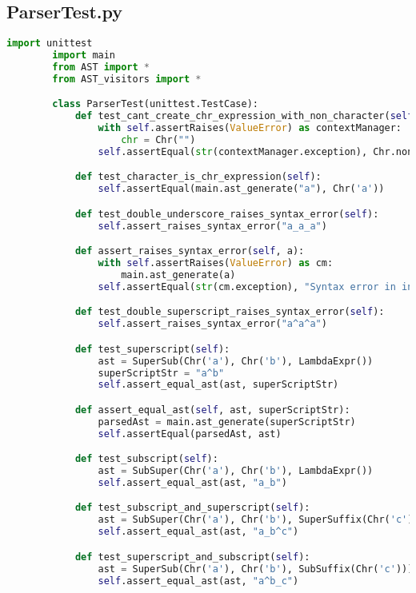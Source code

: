 \subsection{ParserTest.py}

    \begin{lstlisting}[language=Python]
        import unittest
        import main
        from AST import *
        from AST_visitors import *

        class ParserTest(unittest.TestCase):
            def test_cant_create_chr_expression_with_non_character(self):
                with self.assertRaises(ValueError) as contextManager:
                    chr = Chr("")
                self.assertEqual(str(contextManager.exception), Chr.non_character_error_description)

            def test_character_is_chr_expression(self):
                self.assertEqual(main.ast_generate("a"), Chr('a'))

            def test_double_underscore_raises_syntax_error(self):
                self.assert_raises_syntax_error("a_a_a")

            def assert_raises_syntax_error(self, a):
                with self.assertRaises(ValueError) as cm:
                    main.ast_generate(a)
                self.assertEqual(str(cm.exception), "Syntax error in input!")

            def test_double_superscript_raises_syntax_error(self):
                self.assert_raises_syntax_error("a^a^a")

            def test_superscript(self):
                ast = SuperSub(Chr('a'), Chr('b'), LambdaExpr())
                superScriptStr = "a^b"
                self.assert_equal_ast(ast, superScriptStr)

            def assert_equal_ast(self, ast, superScriptStr):
                parsedAst = main.ast_generate(superScriptStr)
                self.assertEqual(parsedAst, ast)

            def test_subscript(self):
                ast = SubSuper(Chr('a'), Chr('b'), LambdaExpr())
                self.assert_equal_ast(ast, "a_b")

            def test_subscript_and_superscript(self):
                ast = SubSuper(Chr('a'), Chr('b'), SuperSuffix(Chr('c')))
                self.assert_equal_ast(ast, "a_b^c")

            def test_superscript_and_subscript(self):
                ast = SuperSub(Chr('a'), Chr('b'), SubSuffix(Chr('c')))
                self.assert_equal_ast(ast, "a^b_c")


\end{lstlisting}
